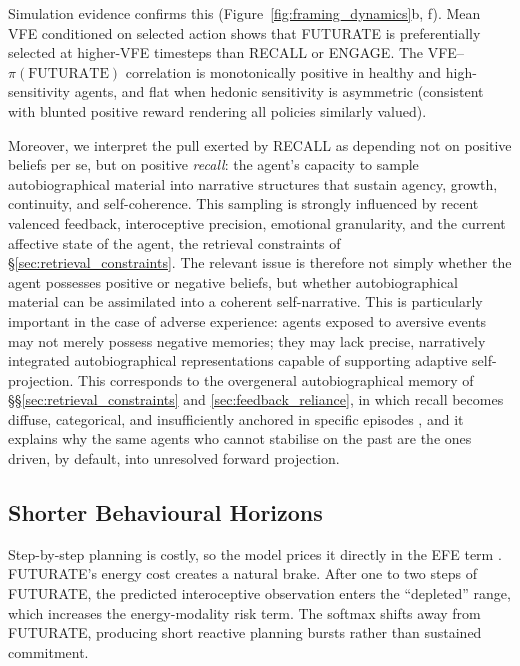 \documentclass[11pt,a4paper]{article}
\newcommand{\rr}{\color{red!70!black}}
\begin{document}
Simulation evidence confirms this (Figure~\ref{fig:framing_dynamics}b, f). Mean VFE conditioned on selected action shows that FUTURATE is preferentially selected at higher-VFE timesteps than RECALL or ENGAGE. The VFE--$\pi(\text{FUTURATE})$ correlation is monotonically positive in healthy and high-sensitivity agents, and flat when hedonic sensitivity is asymmetric (consistent with blunted positive reward rendering all policies similarly valued).

{\rr Moreover, we interpret the pull exerted by RECALL as depending not on positive beliefs per se, but on positive \emph{recall}: the agent's capacity to sample autobiographical material into narrative structures that sustain agency, growth, continuity, and self-coherence. This sampling is strongly influenced by recent valenced feedback, interoceptive precision, emotional granularity, and the current affective state of the agent, the retrieval constraints of \S\ref{sec:retrieval_constraints}. The relevant issue is therefore not simply whether the agent possesses positive or negative beliefs, but whether autobiographical material can be assimilated into a coherent self-narrative. This is particularly important in the case of adverse experience: agents exposed to aversive events may not merely possess negative memories; they may lack precise, narratively integrated autobiographical representations capable of supporting adaptive self-projection. This corresponds to the overgeneral autobiographical memory of \S\S\ref{sec:retrieval_constraints} and \ref{sec:feedback_reliance}, in which recall becomes diffuse, categorical, and insufficiently anchored in specific episodes \citep{williamsetal2007, watkinsteasdale2001}, and it explains why the same agents who cannot stabilise on the past are the ones driven, by default, into unresolved forward projection.}

\subsection{Shorter Behavioural Horizons}\label{sec:short_horizon}

Step-by-step planning is costly, so the model prices it directly in the EFE term \citep{dawnivdayan2005, koolcushmangershman2016, shenhavbotvinickcohen2013, keramatismittenaar2016}. FUTURATE's energy cost creates a natural brake. After one to two steps of FUTURATE, the predicted interoceptive observation enters the ``depleted'' range, which increases the energy-modality risk term. The softmax shifts away from FUTURATE, producing short reactive planning bursts rather than sustained commitment.
\end{document}
